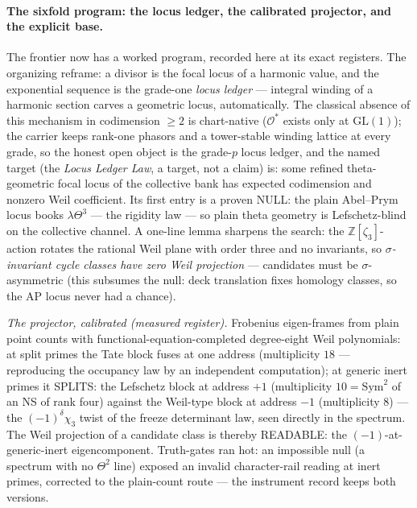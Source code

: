 \documentclass[11pt]{article}
\theoremstyle{definition}
\theoremstyle{remark}
\begin{document}
\paragraph{The sixfold program: the locus ledger, the calibrated
projector, and the explicit base.}  The frontier now has a worked
program, recorded here at its exact registers.  The organizing reframe:
a divisor is the focal locus of a harmonic value, and the exponential
sequence is the grade-one \emph{locus ledger} --- integral winding of a
harmonic section carves a geometric locus, automatically.  The classical
absence of this mechanism in codimension $\ge2$ is chart-native
($\mathcal O^*$ exists only at $\mathrm{GL}(1)$); the carrier keeps
rank-one phasors and a tower-stable winding lattice at every grade, so
the honest open object is the grade-$p$ locus ledger, and the named
target (the \emph{Locus Ledger Law}, a target, not a claim) is: some
refined theta-geometric focal locus of the collective bank has expected
codimension and nonzero Weil coefficient.  Its first entry is a proven
NULL: the plain Abel--Prym locus books $\lambda\Theta^3$ --- the
rigidity law --- so plain theta geometry is Lefschetz-blind on the
collective channel.  A one-line lemma sharpens the search: the
$\mathbb Z[\zeta_3]$-action rotates the rational Weil plane with order
three and no invariants, so \emph{$\sigma$-invariant cycle classes have
zero Weil projection} --- candidates must be $\sigma$-asymmetric (this
subsumes the null: deck translation fixes homology classes, so the AP
locus never had a chance).

\emph{The projector, calibrated (measured register).}  Frobenius
eigen-frames from plain point counts with functional-equation-completed
degree-eight Weil polynomials: at split primes the Tate block fuses at
one address (multiplicity $18$ --- reproducing the occupancy law by an
independent computation); at generic inert primes it SPLITS: the
Lefschetz block at address $+1$ (multiplicity $10=\mathrm{Sym}^2$ of an
NS of rank four) against the Weil-type block at address $-1$
(multiplicity $8$) --- the $(-1)^{\delta}\chi_3$ twist of the freeze
determinant law, seen directly in the spectrum.  The Weil projection of
a candidate class is thereby READABLE: the $(-1)$-at-generic-inert
eigencomponent.  Truth-gates ran hot: an impossible null (a spectrum
with no $\Theta^2$ line) exposed an invalid character-rail reading at
inert primes, corrected to the plain-count route --- the instrument
record keeps both versions.
\end{document}
